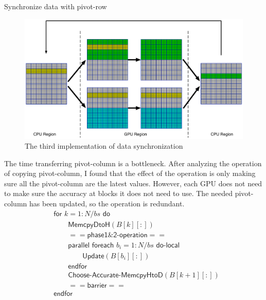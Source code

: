 \documentclass[12pt]{article}
\makeatletter
\renewenvironment{itemize}
{\list{$\bullet$}{\leftmargin\z@ \labelwidth\z@ \itemindent-\leftmargin
\let\makelabel\descriptionlabel}}
{\endlist}
\makeatother
\begin{document}
\begin{itemize}
    \newpage

    \item Synchronize data with pivot-row
    \begin{figure}[ht]
        \includegraphics[scale=.25]{./multiGPU_algo_diagram3.png}
        \caption{The third implementation of data synchronization}
    \end{figure}
    \begin{flushleft}
        The time transferring pivot-column is a bottleneck. After analyzing the operation of copying pivot-column, I found that the effect of the operation is only making sure all the pivot-column are the latest values. However, each GPU does not need to make sure the accuracy at blocks it does not need to use. The needed pivot-column has been updated, so the operation is redundant.
        \begin{align*}
            &\mathsf{for} \,\, k = 1:N/bs \,\, \mathsf{do} \\
            &\quad \quad \mathsf{MemcpyDtoH} (B[k][:]) \\
            &\quad \quad \mathsf{==phase1\&2\text{-}operation==} \\
            &\quad \quad \mathsf{parallel} \,\, \mathsf{foreach} \,\, b_i = 1:N/bs \,\, \mathsf{do\text{-}local} \\
            &\quad \quad \quad \quad \mathsf{Update} (B[b_i][:]) \\
            &\quad \quad \mathsf{endfor} \\
            &\quad \quad \mathsf{Choose\text{-}Accurate\text{-}MemcpyHtoD} (B[k+1][:]) \\
            &\quad \quad \mathsf{==barrier==} \\
            &\mathsf{endfor}
        \end{align*}
    \end{flushleft}


\end{itemize}
\end{document}
